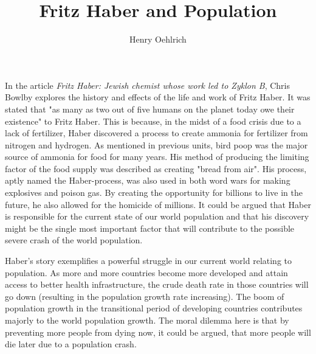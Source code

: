 \documentclass{article}
\title{Fritz Haber and Population}
\author{Henry Oehlrich}
\begin{document}
\maketitle{}

In the article \textit{Fritz Haber: Jewish chemist whose work led to Zyklon B},
Chris Bowlby explores the history and effects of the life and work of Fritz
Haber. It was stated that "as many as two out of five humans on the planet
today owe their existence" to Fritz Haber. This is because, in the midst of a
food crisis due to a lack of fertilizer, Haber discovered a process to create
ammonia for fertilizer from nitrogen and hydrogen. As mentioned in previous
units, bird poop was the major source of ammonia for food for many years. His
method of producing the limiting factor of the food supply was described as
creating "bread from air". His process, aptly named the Haber-process, was also
used in both word wars for making explosives and poison gas. By creating the
opportunity for billions to live in the future, he also allowed for the
homicide of millions. It could be argued that Haber is responsible for the
current state of our world population and that his discovery might be the
single most important factor that will contribute to the possible severe crash
of the world population.

Haber's story exemplifies a powerful struggle in our current world relating to
population. As more and more countries become more developed and attain access
to better health infrastructure, the crude death rate in those countries will go
down (resulting in the population growth rate increasing). The boom of
population growth in the transitional period of developing countries
contributes majorly to the world population growth. The moral dilemma here is
that by preventing more people from dying now, it could be argued, that more
people will die later due to a population crash.
\end{document}
